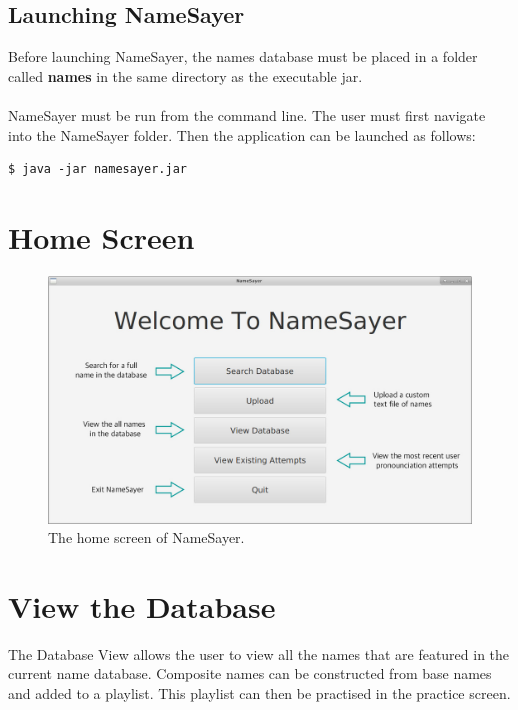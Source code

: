 \documentclass{article}
\begin{document}
\subsection{Launching NameSayer}
Before launching NameSayer, the names database must be placed in a folder called
\textbf{names} in the same directory as  the executable jar. \\

 \ \\

NameSayer must be run from the command line. The user must first navigate into
the NameSayer folder. Then the application can be launched as follows:

\begin{verbatim}
$ java -jar namesayer.jar
\end{verbatim}

\section{Home Screen}

\begin{figure}[H]
	\includegraphics[width=\textwidth]{images/1_home.jpg}
	\caption{The home screen of NameSayer.}
	\label{home}
\end{figure}

\section{View the Database}
The Database View allows the user to view all the names that are  featured in
the current name database. Composite names can be constructed from base names
and added to a playlist. This playlist can then be practised in the practice
screen.
\end{document}
